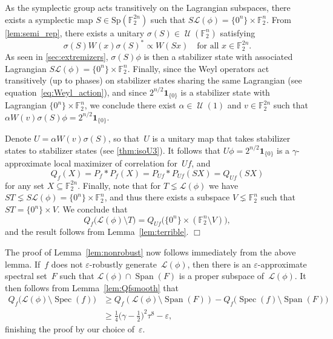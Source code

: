 \documentclass[11pt]{amsart}
\newcommand{\F}{\mathbb{F}} %
\newcommand{\Lcal}{\mathcal{L}}
\DeclareMathOperator{\vspan}{Span} %
\newcommand{\Sp}{\mathrm{Sp}}
\newcommand{\one}{\mathbf{1}}
\newcommand{\eps}{\varepsilon}
\DeclareMathOperator{\U}{\mathcal{U}}
\DeclareMathOperator{\spec}{Spec}
\theoremstyle{plain}
\theoremstyle{definition}
\theoremstyle{remark}
\renewenvironment{proof}[1][]{
    	\begin{trivlist}
     	\item[\hspace{\labelsep}{\em\noindent Proof#1:\/}]}
     	{{\hfill$\Box$}
    	\end{trivlist}
  }
\begin{document}
\begin{proof}
As the symplectic group acts transitively on the Lagrangian subspaces, there exists a symplectic map $S\in \Sp(\F_2^{2n})$ such that $S\Lcal(\phi) = \{0^n\} \times \F_2^n$.
From \cref{lem:semi_rep}, there exists a unitary $\sigma(S) \in \U(\F_2^n)$ satisfying
$$\sigma(S) W(x) \sigma(S)^* \propto W(Sx) \quad \text{for all $x\in \F_2^{2n}$.}$$
As seen in \cref{sec:extremizers}, $\sigma(S) \phi$ is then a stabilizer state with associated Lagrangian $S\Lcal(\phi) = \{0^n\} \times \F_2^n$.
Finally, since the Weyl operators act transitively (up to phases) on stabilizer states sharing the same Lagrangian (see equation~\eqref{eq:Weyl_action}), and since $2^{n/2}\one_{\{0\}}$ is a stabilizer state with Lagrangian $\{0^n\} \times \F_2^n$, we conclude there exist $\alpha \in \U(1)$ and $v\in \F_2^{2n}$ such that $\alpha W(v) \sigma(S) \phi = 2^{n/2}\one_{\{0\}}$.

Denote $U = \alpha W(v) \sigma(S)$, so that~$U$ is a unitary map that takes stabilizer states to stabilizer states (see \cref{thm:isoU3}).
It follows that $U\phi = 2^{n/2}\one_{\{0\}}$ is a $\gamma$-approximate local maximizer of correlation for~$Uf$, and
\begin{equation*}
    Q_f(X) = P_f * P_f(X) = P_{Uf} * P_{Uf}(SX) = Q_{Uf}(SX)
\end{equation*}
for any set $X\subseteq \F_2^{2n}$.
Finally, note that for $T\lneq \Lcal(\phi)$ we have $ST \lneq S\Lcal(\phi) = \{0^n\} \times \F_2^n$, and thus there exists a subspace $V\lneq \F_2^n$ such that $ST = \{0^n\} \times V$.
We conclude that
\begin{equation*}
    Q_f\big(\mathcal L(\phi)\setminus T\big)
    =
    Q_{Uf}\big(\{0^n\}\times (\F_2^n\setminus V) \big),
\end{equation*}
and the result follows from Lemma~\ref{lem:terrible}.
\end{proof}

The proof of Lemma~\ref{lem:nonrobust} now follows immediately from the above lemma. If~$f$ does not $\eps$-robustly generate~$\mathcal L(\phi)$, then there is an $\eps$-approximate spectral set~$F$ such that $\mathcal L(\phi)\cap \vspan(F)$ is a proper subspace of~$\mathcal L(\phi)$.
It then follows from Lemma~\ref{lem:Qfsmooth} that
\begin{align*}
    Q_f\big(\mathcal L(\phi)\setminus \spec(f)\big) 
    &\geq Q_f(\mathcal L(\phi)\setminus \vspan(F)) - Q_f\big(\spec(f)\setminus \vspan(F)\big)\\
    &\geq \tfrac{1}{4} \big(\gamma - \tfrac{1}{2}\big)^2\tau^8 - \eps,
\end{align*}  
finishing the proof by our choice of~$\eps$.
\end{document}

